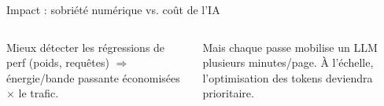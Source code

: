 \begin{frame}{Impact : sobriété numérique vs. coût de l'IA}
  \begin{columns}[T]
    \begin{examples}
      \footnotesize Mieux détecter les régressions de perf (poids, requêtes) $\Rightarrow$ énergie/bande passante
      économisées $\times$ le trafic.
    \end{examples}
    \begin{alertblock}{}
      \footnotesize Mais chaque passe mobilise un LLM plusieurs minutes/page. À l'échelle,
      l'\alert{optimisation des tokens} deviendra prioritaire.
    \end{alertblock}
  \end{columns}
\end{frame}
